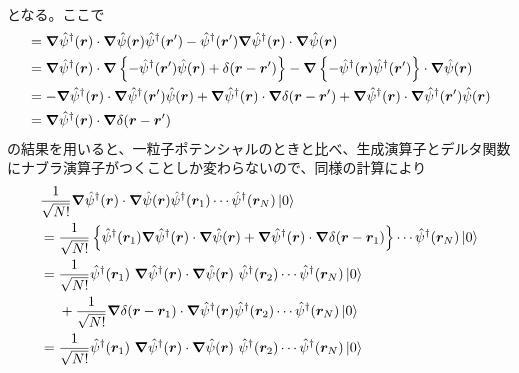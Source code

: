 \documentclass[dvipdfmx, 11pt, a4paper]{jsarticle}
\theoremstyle{definition}
\numberwithin{equation}{section}
\begin{document}
\begin{derivationBox}
\begin{align}
        \end{align}
        となる。ここで
        \begin{align}
            [\bm{\nabla}\hat{\psi}^\dagger(\bm{r})\cdot\bm{\nabla}\hat{\psi}(\bm{r}), \hat{\psi}^\dagger(\bm{r}')]&= \bm{\nabla}\hat{\psi}^\dagger(\bm{r})\cdot\bm{\nabla}\hat{\psi}(\bm{r}) \hat{\psi}^\dagger(\bm{r}') - \hat{\psi}^\dagger(\bm{r}')\bm{\nabla}\hat{\psi}^\dagger(\bm{r})\cdot\bm{\nabla}\hat{\psi}(\bm{r}) \notag \\
            &= \bm{\nabla}\hat{\psi}^\dagger(\bm{r})\cdot\bm{\nabla}\left\{- \hat{\psi}^\dagger(\bm{r}')\hat{\psi}(\bm{r}) +\delta(\bm{r}-\bm{r}') \right\} - \bm{\nabla}\left\{ -\hat{\psi}^\dagger(\bm{r})\hat{\psi}^\dagger(\bm{r}') \right\}\cdot\bm{\nabla}\hat{\psi}(\bm{r}) \notag \\
            &= -\bm{\nabla}\hat{\psi}^\dagger(\bm{r})\cdot\bm{\nabla} \hat{\psi}^\dagger(\bm{r}')\hat{\psi}(\bm{r}) +\bm{\nabla}\hat{\psi}^\dagger(\bm{r})\cdot\bm{\nabla}\delta(\bm{r}-\bm{r}')  +\bm{\nabla}\hat{\psi}^\dagger(\bm{r})\cdot\bm{\nabla}\hat{\psi}^\dagger(\bm{r}')\hat{\psi}(\bm{r}) \notag \\
            &= \bm{\nabla}\hat{\psi}^\dagger(\bm{r})\cdot\bm{\nabla}\delta(\bm{r}-\bm{r}') 
        \end{align}
        の結果を用いると、一粒子ポテンシャルのときと比べ、生成演算子とデルタ関数にナブラ演算子がつくことしか変わらないので、同様の計算により
        \begin{align}
            &\frac{1}{\sqrt{N!}}\bm{\nabla}\hat{\psi}^\dagger(\bm{r})\cdot \bm{\nabla}\hat{\psi}(\bm{r}) \hat{\psi}^\dagger(\bm{r}_1)\cdots\hat{\psi}^\dagger(\bm{r}_N)\ket{0} \notag \\
            &= \frac{1}{\sqrt{N!}}\left\{ \hat{\psi}^\dagger(\bm{r}_1)\bm{\nabla}\hat{\psi}^\dagger(\bm{r})\cdot\bm{\nabla}\hat{\psi}(\bm{r}) + \bm{\nabla}\hat{\psi}^\dagger(\bm{r})\cdot\bm{\nabla} \delta(\bm{r}-\bm{r}_1)  \right\}\cdots\hat{\psi}^\dagger(\bm{r}_N)\ket{0} \notag \\
            &= \frac{1}{\sqrt{N!}} \hat{\psi}^\dagger(\bm{r}_1)\ \bm{\nabla}\hat{\psi}^\dagger(\bm{r})\cdot \bm{\nabla}\hat{\psi}(\bm{r})\ \hat{\psi}^\dagger(\bm{r}_2)\cdots\hat{\psi}^\dagger(\bm{r}_N)\ket{0} \notag \\
            &\ \ \ \ + \frac{1}{\sqrt{N!}} \bm{\nabla}\delta(\bm{r}-\bm{r}_1)\cdot \bm{\nabla}\hat{\psi}^\dagger(\bm{r})\hat{\psi}^\dagger(\bm{r}_2)\cdots\hat{\psi}^\dagger(\bm{r}_N)\ket{0} \notag \\
            &= \frac{1}{\sqrt{N!}} \hat{\psi}^\dagger(\bm{r}_1)\ \bm{\nabla}\hat{\psi}^\dagger(\bm{r})\cdot \bm{\nabla}\hat{\psi}(\bm{r})\ \hat{\psi}^\dagger(\bm{r}_2)\cdots\hat{\psi}^\dagger(\bm{r}_N)\ket{0} \notag \\

\end{align}
\end{derivationBox}
\end{document}
